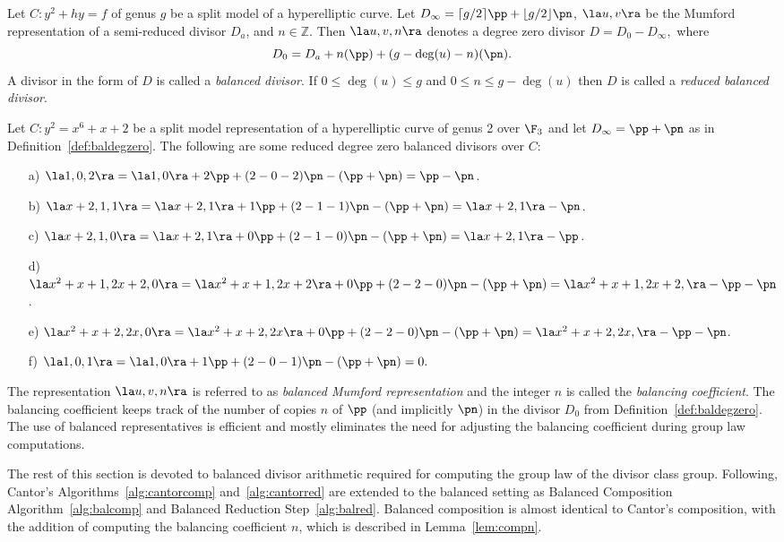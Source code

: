 \bd\label{def:baldegzero}
\cite[Adapted from Definition~10.4.6]{Galbraith_PKC_2012}
Let $C : y^2 + hy = f$ of genus $g$ be a split model of a hyperelliptic curve. Let
$D_{\infty} = \lceil g/2 \rceil \pp + \lfloor g/2 \rfloor \pn$, $\la u,v \ra$ be
the Mumford representation of a semi-reduced divisor $D_a$, and $n \in
\mathbb{Z}$. Then $\la u,v,n \ra$ denotes a degree zero divisor
$D = D_0 - D_{\infty},$ where $$D_0 = D_a + n(\pp) + (g - \deg(u) - n)(\pn).$$ A
divisor in the form of $D$ is called a \emph{balanced divisor}. If $0 \leq
\deg(u) \leq g$ and $0 \leq n \leq g-\deg(u)$ then $D$ is called a 
\emph{reduced balanced divisor}. 
\ed

\be\label{ex:bal} 
Let $C : y^2 = x^6 + x + 2$ be a split model representation of a hyperelliptic curve
of genus 2 over $\F_3$ and let $D_{\infty} = \pp + \pn$ as in
Definition~\ref{def:baldegzero}. The following are some reduced degree zero
balanced divisors over $C$:
\begin{itemize}
  \item[a)] $\la 1,0,2 \ra = \la 1,0 \ra + 2\pp + (2 - 0 - 2)\pn -
  (\pp + \pn) =  \pp - \pn$. 
  \item[b)] $\la x + 2,1,1 \ra = \la x + 2,1 \ra + 1\pp + (2 - 1 - 1)\pn -
  (\pp + \pn) =  \la x + 2,1 \ra - \pn$.
  \item[c)] $\la x + 2,1,0 \ra = \la x + 2,1 \ra + 0\pp + (2 - 1 - 0)\pn -
  (\pp + \pn) =  \la x + 2,1 \ra - \pp$.
  \item[d)] $\la x^2 + x + 1,2x + 2,0 \ra = \la x^2 + x + 1,2x + 2 \ra + 0\pp
  + (2 - 2 - 0)\pn - (\pp + \pn) =  \la x^2 + x + 1,2x + 2, \ra - \pp - \pn$.
  \item[e)] $\la x^2 + x + 2,2x,0 \ra = \la x^2 + x + 2, 2x \ra + 0\pp + (2 -
  2 - 0)\pn - (\pp + \pn) =  \la x^2 + x + 2,2x, \ra - \pp - \pn$.
  \item[f)] $\la 1,0,1 \ra =  \la 1,0 \ra + 1\pp + (2 - 0 - 1)\pn -
  (\pp + \pn) =  0. $
\end{itemize} 
\ee

The representation $\la u,v,n \ra$ is referred to as \emph{balanced Mumford
representation} and the integer $n$ is called the \emph{balancing coefficient}.
The balancing coefficient keeps track of the number of copies $n$ of $\pp$ (and
implicitly $\pn$) in the divisor $D_0$ from Definition~\ref{def:baldegzero}. The
use of balanced representatives is efficient and mostly eliminates the need for
adjusting the balancing coefficient during group law computations.

The rest of this section is devoted to balanced divisor arithmetic required for
computing the group law of the divisor class group. Following, Cantor's
Algorithms~\ref{alg:cantorcomp} and~\ref{alg:cantorred} are extended to the
balanced setting as Balanced Composition Algorithm~\ref{alg:balcomp} and
Balanced Reduction Step~\ref{alg:balred}. Balanced composition is almost
identical to Cantor's composition, with the addition of computing the balancing
coefficient $n$, which is  described in Lemma~\ref{lem:compn}.

